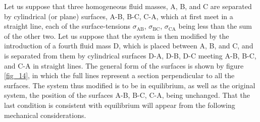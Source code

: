 \documentclass[12pt]{memoir}
\begin{document}
Let us suppose that three homogeneous fluid masses, A, B, and C are separated by cylindrical (or plane) surfaces, A-B, B-C, C-A, which at first meet in a straight line, each of the surface-tensions $\sigma_{\text{AB}}$, $\sigma_{\text{BC}}$, $\sigma_{\text{CA}}$ being less than the sum of the other two. Let us suppose that the system is then modified by the introduction of a fourth fluid mass D, which is placed between A, B, and C, and is separated from them by cylindrical surfaces D-A, D-B, D-C meeting A-B, B-C, and C-A in straight lines. The general form of the surfaces is shown by figure \ref{fig_14}, in which the full lines represent a section perpendicular to all the surfaces. The system thus modified is to be in equilibrium, as well as the original system, the position of the surfaces A-B, B-C, C-A, being unchanged. That the last condition is consistent with equilibrium will appear from the following mechanical considerations.
\end{document}
